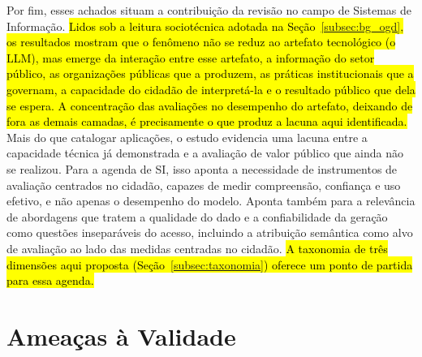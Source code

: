 \documentclass[brazilian]{sbc2025}
\newif\ifhl \hltrue
\newcommand{\rev}[1]{\ifhl\sethlcolor{yellow}\hl{#1}\else#1\fi}
\begin{document}
Por fim, esses achados situam a contribuição da revisão no campo de Sistemas de Informação. \rev{Lidos sob a leitura sociotécnica adotada na Seção~\mbox{\ref{subsec:bg_ogd}}, os resultados mostram que o fenômeno não se reduz ao artefato tecnológico (o LLM), mas emerge da interação entre esse artefato, a informação do setor público, as organizações públicas que a produzem, as práticas institucionais que a governam, a capacidade do cidadão de interpretá-la e o resultado público que dela se espera. A concentração das avaliações no desempenho do artefato, deixando de fora as demais camadas, é precisamente o que produz a lacuna aqui identificada.} Mais do que catalogar aplicações, o estudo evidencia uma lacuna entre a capacidade técnica já demonstrada e a avaliação de valor público que ainda não se realizou. Para a agenda de SI, isso aponta a necessidade de instrumentos de avaliação centrados no cidadão, capazes de medir compreensão, confiança e uso efetivo, e não apenas o desempenho do modelo. Aponta também para a relevância de abordagens que tratem a qualidade do dado e a confiabilidade da geração como questões inseparáveis do acesso, incluindo a atribuição semântica como alvo de avaliação ao lado das medidas centradas no cidadão. \rev{A taxonomia de três dimensões aqui proposta (Seção~\mbox{\ref{subsec:taxonomia}}) oferece um ponto de partida para essa agenda.}

\section{Ameaças à Validade}
\label{sec:ameacas}
\end{document}

